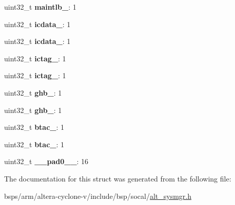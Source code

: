 \begin{DoxyCompactItemize}
uint32\+\_\+t {\bfseries maintlb\+\_}\+: 1
\item 
\mbox{\label{structALT__SYSMGR__PARITYINJ__s_ac6e2864ba52d558e2228a368e0f67b0c}} 
uint32\+\_\+t {\bfseries icdata\+\_}\+: 1
\item 
\mbox{\label{structALT__SYSMGR__PARITYINJ__s_af94b61aa3254d8ce54fb18218d7a2577}} 
uint32\+\_\+t {\bfseries icdata\+\_}\+: 1
\item 
\mbox{\label{structALT__SYSMGR__PARITYINJ__s_a180e297b80e5bbabe5c5570a622226bb}} 
uint32\+\_\+t {\bfseries ictag\+\_}\+: 1
\item 
\mbox{\label{structALT__SYSMGR__PARITYINJ__s_a1b9f4065db466989f882ad37ad435c8b}} 
uint32\+\_\+t {\bfseries ictag\+\_}\+: 1
\item 
\mbox{\label{structALT__SYSMGR__PARITYINJ__s_ac8b20d540983b763c210bceeb9e63bbb}} 
uint32\+\_\+t {\bfseries ghb\+\_}\+: 1
\item 
\mbox{\label{structALT__SYSMGR__PARITYINJ__s_a84f3406a5b76748152e9d48968310c84}} 
uint32\+\_\+t {\bfseries ghb\+\_}\+: 1
\item 
\mbox{\label{structALT__SYSMGR__PARITYINJ__s_ad4c3790f82889b17ceab07ba082f3b1b}} 
uint32\+\_\+t {\bfseries btac\+\_}\+: 1
\item 
\mbox{\label{structALT__SYSMGR__PARITYINJ__s_acc6ffd51145f13aeae092c504390cc22}} 
uint32\+\_\+t {\bfseries btac\+\_}\+: 1
\item 
\mbox{\label{structALT__SYSMGR__PARITYINJ__s_af7e97ed26a75d5427c4149809343a84b}} 
uint32\+\_\+t {\bfseries \+\_\+\+\_\+pad0\+\_\+\+\_\+}\+: 16
\end{DoxyCompactItemize}


The documentation for this struct was generated from the following file\+:\begin{DoxyCompactItemize}
\item 
bsps/arm/altera-\/cyclone-\/v/include/bsp/socal/\mbox{\hyperlink{alt__sysmgr_8h}{alt\+\_\+sysmgr.\+h}}\end{DoxyCompactItemize}
